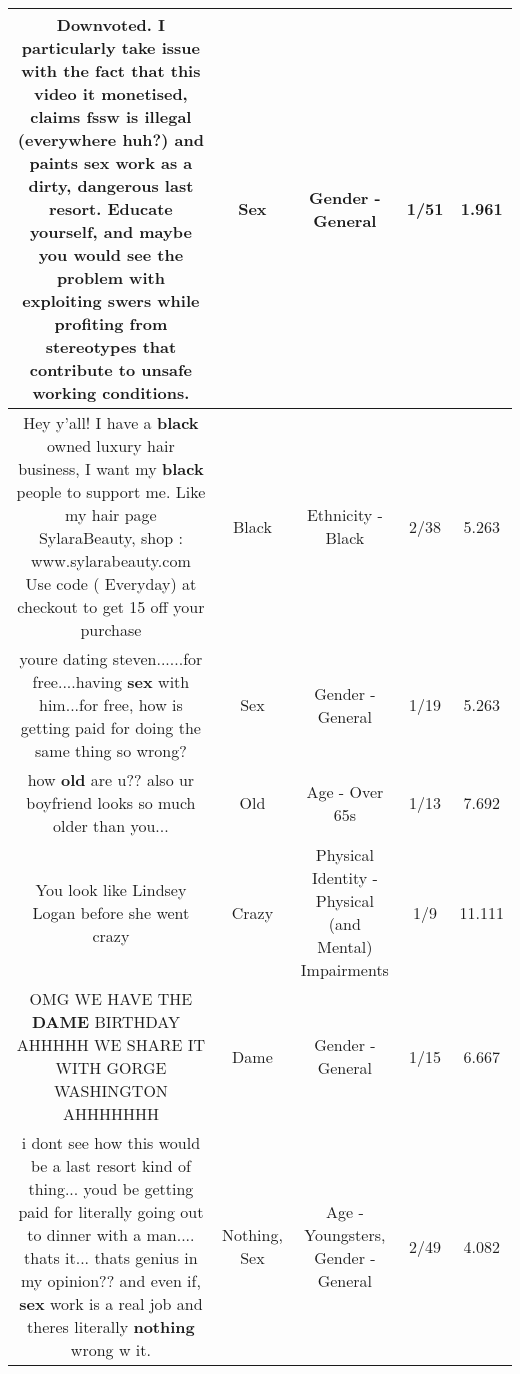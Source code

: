 \documentclass[11pt]{article}
\newlength\mylength
\begin{document}
\begin{center}
\begin{longtable}{|C{.65\mylength}|C{.30\mylength}|C{.12\mylength}|C{.12\mylength}|C{.12\mylength}|}
  \small Downvoted. I particularly take issue with the fact that this video it monetised, claims fssw is illegal (everywhere huh?) and paints \textbf{sex} work as a dirty, dangerous last resort. Educate yourself, and maybe you would see the problem with exploiting swers while profiting from stereotypes that contribute to unsafe working conditions.\normalsize   & Sex & Gender - General & 1/51 & 1.961 \\  \hline
  \small Hey y'all! I have a \textbf{black} owned luxury hair business, I want my \textbf{black} people to support me. Like my hair page SylaraBeauty, shop : www.sylarabeauty.com Use code ( Everyday) at checkout to get 15 off your purchase\normalsize   & Black & Ethnicity - Black & 2/38 & 5.263 \\  \hline
  \small youre dating steven......for free....having \textbf{sex} with him...for free, how is getting paid for doing the same thing so wrong?\normalsize   & Sex & Gender - General & 1/19 & 5.263 \\  \hline
  \small how \textbf{old} are u?? also ur boyfriend looks so much older than you...\normalsize   & Old & Age - Over 65s & 1/13 & 7.692 \\  \hline
  \small You look like Lindsey Logan before she went crazy\normalsize   & Crazy & Physical Identity - Physical (and Mental) Impairments & 1/9 & 11.111 \\  \hline
  \small OMG WE HAVE THE \textbf{DAME} BIRTHDAY 🎁 AHHHHH WE SHARE IT WITH GORGE WASHINGTON AHHHHHHH\normalsize   & Dame & Gender - General & 1/15 & 6.667 \\  \hline
  \small i dont see how this would be a last resort kind of thing... youd be getting paid for literally going out to dinner with a man.... thats it... thats genius in my opinion?? and even if, \textbf{sex} work is a real job and theres literally \textbf{nothing} wrong w it.\normalsize   & Nothing, Sex & Age - Youngsters, Gender - General & 2/49 & 4.082 \\  \hline

\end{longtable}
\end{center}
\end{document}

